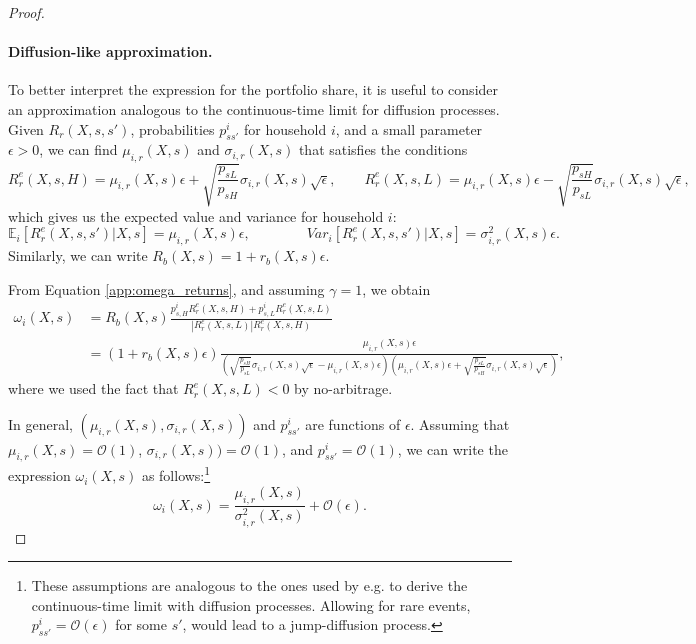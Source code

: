 \begin{proof}
\paragraph{Diffusion-like approximation.} To better interpret the expression for the portfolio share, it is useful to consider an approximation analogous to the continuous-time limit for diffusion processes. Given $R_{r}(X,s,s')$,  probabilities $p_{ss'}^i$ for household $i$, and a small parameter $\epsilon >0$, we can find $\mu_{i,r}(X,s)$ and $\sigma_{i,r}(X,s)$ that satisfies the conditions\small
\begin{equation}
    R_{r}^e(X,s,H) = \mu_{i,r}(X,s) \epsilon + \sqrt{\frac{p_{sL}}{p_{sH}}} \sigma_{i,r}(X,s) \sqrt{\epsilon}, \qquad 
    R_{r}^e(X,s,L) = \mu_{i,r}(X,s) \epsilon - \sqrt{\frac{p_{sH}}{p_{sL}}} \sigma_{i,r}(X,s) \sqrt{\epsilon}, 
\end{equation}\normalsize
which gives us the expected value and variance for household $i$:
\begin{equation}
    \mathbb{E}_i[R_r^e(X,s,s')|X,s] = \mu_{i,r}(X,s) \epsilon, \qquad \qquad 
    Var_i[R_r^e(X,s,s')|X,s] = \sigma^2_{i,r}(X,s) \epsilon.
\end{equation}
Similarly, we can write $R_b(X,s) = 1 + r_b(X,s) \epsilon$. 

From Equation \eqref{app:omega_returns}, and assuming $\gamma = 1$, we obtain
\begin{align}
    \omega_{i}(X,s) &= R_b(X,s) \frac{p_{s,H}^i R_r^e(X,s,H) + p_{s,L}^i R_r^e(X,s,L)}{|R_r^e(X,s,L)|R_r^e(X,s,H)}\nonumber\\
    &=(1+r_b(X,s) \epsilon) \frac{\mu_{i,r}(X,s) \epsilon}{\left(\sqrt{\frac{p_{sH}}{p_{sL}}} \sigma_{i,r}(X,s) \sqrt{\epsilon}- \mu_{i,r}(X,s) \epsilon\right)\left(\mu_{i,r}(X,s) \epsilon + \sqrt{\frac{p_{sL}}{p_{sH}}} \sigma_{i,r}(X,s) \sqrt{\epsilon} \right)},
\end{align}
where we used the fact that $R_r^e(X,s,L) < 0$ by no-arbitrage. 

In general, $(\mu_{i,r}(X,s),\sigma_{i,r}(X,s))$ and $p_{ss'}^i$ are functions of $\epsilon$. 
Assuming that $\mu_{i,r}(X,s) = \mathcal{O}(1)$, $\sigma_{i,r}(X,s)) = \mathcal{O}(1)$, and $p_{ss'}^i = \mathcal{O}(1)$, we can write the expression $\omega_{i}(X,s)$ as follows:\footnote{These assumptions are analogous to the ones used by e.g. \citet{merton1992continuous} to derive the continuous-time limit with diffusion processes. Allowing for rare events, $p_{ss'}^i = \mathcal{O}(\epsilon)$ for some $s'$, would lead to a jump-diffusion process.  }
\begin{equation}
    \omega_{i}(X,s) =  \frac{\mu_{i,r}(X,s)}{\sigma_{i,r}^2(X,s)} + \mathcal{O}(\epsilon).
\end{equation}

\end{proof}


